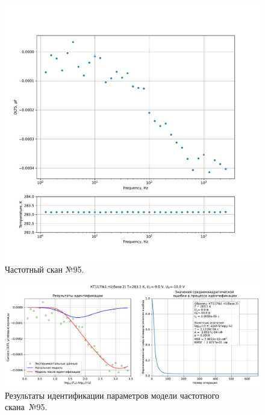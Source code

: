 \begin{figure}[!ht]
    \centering
    \includegraphics[width=1\textwidth]{../plots/КТ117№1_п1(база 2)_2500Гц-1Гц_1пФ_+10С_-9В-10В_20мВ_20мкс_шаг_0,1.pdf}
    \caption{Частотный скан №95.}
    \label{pic:frequency_scan_95}
\end{figure}

\begin{figure}[!ht]
    \centering
    \includegraphics[width=1\textwidth]{../plots/КТ117№1_п1(база 2)_2500Гц-1Гц_1пФ_+10С_-9В-10В_20мВ_20мкс_шаг_0,1_model.pdf}
    \caption{Результаты идентификации параметров модели частотного скана~№95.}
    \label{pic:frequency_scan_model95}
\end{figure}

\pagebreak


